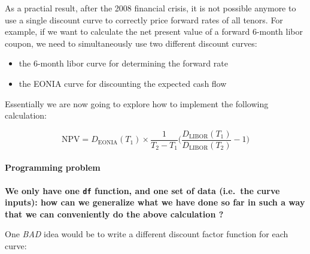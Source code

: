 \documentclass[11pt]{article}
\providecommand{\tightlist}{%
      \setlength{\itemsep}{0pt}\setlength{\parskip}{0pt}}
\begin{document}
As a practial result, after the 2008 financial crisis, it is not
possible anymore to use a single discount curve to correctly price
forward rates of all tenors. For example, if we want to calculate the
net present value of a forward 6-month libor coupon, we need to
simultaneously use two different discount curves:

\begin{itemize}
\tightlist
\item
  the 6-month libor curve for determining the forward rate
\item
  the EONIA curve for discounting the expected cash flow
\end{itemize}

Essentially we are now going to explore how to implement the following
calculation:

\[\mathrm{NPV} = D_{\mathrm{EONIA}}(T_1) \times \frac{1}{T_2-T_1}\Big(\frac{D_{\mathrm{LIBOR}}(T_1)}{D_{\mathrm{LIBOR}}(T_2)} - 1 \Big)\]

\hypertarget{programming-problem}{%
\paragraph{Programming problem}\label{programming-problem}}

\textbf{We only have one \texttt{df} function, and one set of data
(i.e.~the curve inputs): how can we generalize what we have done so far
in such a way that we can conveniently do the above calculation ?}

One \emph{BAD} idea would be to write a different discount factor
function for each curve:
\end{document}
